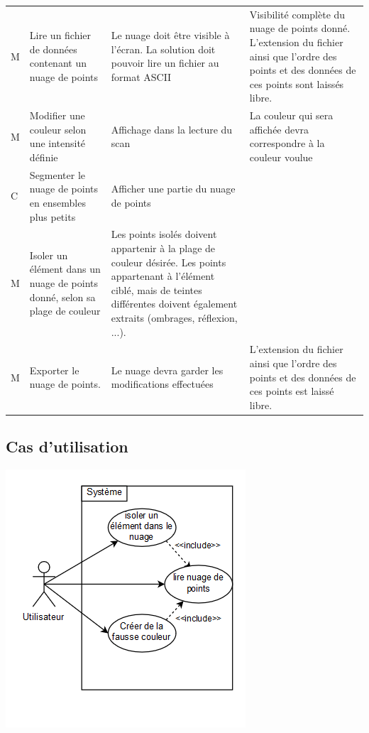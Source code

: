 \documentclass[12pt,titlepage,french]{article}
\begin{document}
\noindent\begin{tabu} to \toprule
     &&&\\\toprule
M &Lire un fichier de données contenant un nuage de points
& Le nuage doit être visible à l'écran. La solution doit pouvoir lire un fichier au format ASCII
& Visibilité complète du nuage de points donné. L'extension du fichier ainsi que l'ordre des points et des données de ces points sont laissés libre.\\\midrule
M & Modifier une couleur selon une intensité définie
& Affichage dans la lecture du scan
& La couleur qui sera affichée devra correspondre à la couleur voulue\\\midrule
C & Segmenter le nuage de points en ensembles plus petits
& Afficher une partie du nuage de points
& \\\midrule
M &Isoler un élément dans un nuage de points donné, selon sa plage de couleur 
& Les points isolés doivent appartenir à la plage de couleur désirée.
Les points appartenant à l'élément ciblé, mais de teintes différentes doivent également extraits (ombrages, réflexion, ...).
& \\\midrule
M & Exporter le nuage de points.
& Le nuage devra garder les modifications effectuées
& L'extension du fichier ainsi que l'ordre des points et des données de ces points est laissé libre.\\\bottomrule
\end{tabu}

\subsection*{Cas d'utilisation}

\begin{center}
    \includegraphics{usecase.PNG}
\end{center}
\end{document}
